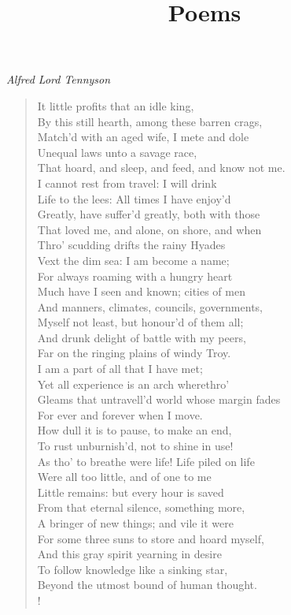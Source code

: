\documentclass[10pt]{memoir}
\title{Poems}
\newcommand{\poemauthor}[1]{{\small\itshape #1}\par\medskip}
\begin{document}
\frontmatter
\maketitle
\clearpage

\mainmatter

\poemauthor{Alfred Lord Tennyson}

\begin{verse}
It little profits that an idle king,\\
By this still hearth, among these barren crags,\\
Match'd with an aged wife, I mete and dole\\
Unequal laws unto a savage race,\\
That hoard, and sleep, and feed, and know not me.\\
I cannot rest from travel: I will drink\\
Life to the lees: All times I have enjoy'd\\
Greatly, have suffer'd greatly, both with those\\
That loved me, and alone, on shore, and when\\
Thro' scudding drifts the rainy Hyades\\
Vext the dim sea: I am become a name;\\
For always roaming with a hungry heart\\
Much have I seen and known; cities of men\\
And manners, climates, councils, governments,\\
Myself not least, but honour'd of them all;\\
And drunk delight of battle with my peers,\\
Far on the ringing plains of windy Troy.\\
I am a part of all that I have met;\\
Yet all experience is an arch wherethro'\\
Gleams that untravell'd world whose margin fades\\
For ever and forever when I move.\\
How dull it is to pause, to make an end,\\
To rust unburnish'd, not to shine in use!\\
As tho' to breathe were life! Life piled on life\\
Were all too little, and of one to me\\
Little remains: but every hour is saved\\
From that eternal silence, something more,\\
A bringer of new things; and vile it were\\
For some three suns to store and hoard myself,\\
And this gray spirit yearning in desire\\
To follow knowledge like a sinking star,\\
Beyond the utmost bound of human thought.\\!


\end{verse}
\end{document}

